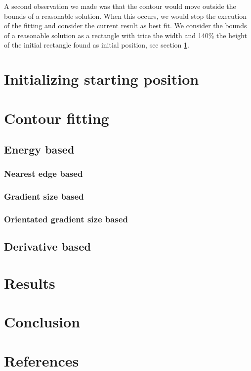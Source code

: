 \documentclass[a4paper,10pt]{article}
\begin{document}
A second observation we made was that the contour would move outside the bounds of a reasonable solution. When this occurs, we would stop the execution of the fitting and consider the current result as best fit. We consider the bounds of a reasonable solution as a rectangle with trice the width and 140\% the height of the initial rectangle found as initial position, see section \ref{sec:initial}.
\section{Initializing starting position}\label{sec:initial}


\section{Contour fitting}\label{sec:fit}
\subsection{Energy based}\label{sec:fit_energy}
\subsubsection{Nearest edge based}
\subsubsection{Gradient size based}
\subsubsection{Orientated gradient size based}

\subsection{Derivative based}\label{sec:fit_deriv}


\section{Results}\label{sec:results}

\section{Conclusion}


\section{References}


\end{document}
